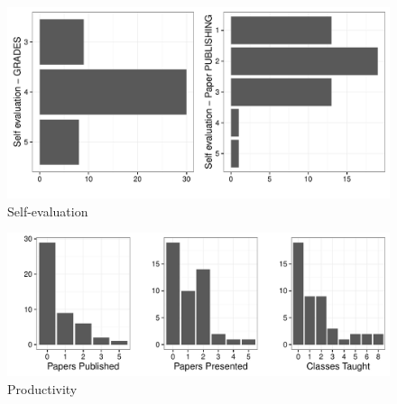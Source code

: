 \documentclass[compress]{beamer}
\begin{document}
\begin{frame}
	\begin{figure}[hbt]
		\centering
		\caption{Self-evaluation}
		\label{self-evaluation}
		\includegraphics[scale=0.5]{autoavaliacoes.pdf}
	\end{figure}
\end{frame}

\begin{frame}
	\begin{figure}[ht]
		\centering
		\caption{Productivity}
		\label{productivity}
		\includegraphics[scale=0.5]{pub_con_classes.pdf}

	\end{figure}
\end{frame}
\end{document}
